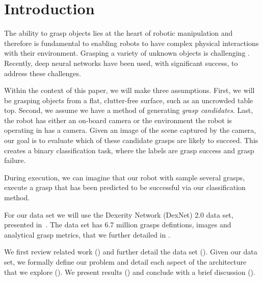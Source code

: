 
\section{Introduction}
\label{sec:intro}

The ability to grasp objects lies at the heart of robotic manipulation and therefore is fundamental to enabling robots to have complex physical interactions with their environment. 
Grasping a variety of unknown objects is challenging . 
Recently, deep neural networks have been used, with significant success, to address these challenges. 

Within the context of this paper, we will make three assumptions. 
First, we will be grasping objects from a flat, clutter-free surface, such as an uncrowded table top. 
Second, we assume we have a method of generating \textit{grasp candidates}. 
Last, the robot has either an on-board camera or the environment the robot is operating in has a camera. 
Given an image of the scene captured by the camera, our goal is to evaluate which of these candidate grasps are likely to succeed. 
This creates a binary classification task, where the labels are grasp success and grasp failure. 

During execution, we can imagine that our robot with sample several grasps, execute a grasp that has been predicted to be successful via our classification method.  

For our data set we will use the Dexerity Network (DexNet) 2.0 data set, presented in~\cite{mahler2017dex}. 
The data set has 6.7 million grasps defintions, images and analytical grasp metrics, that we further detailed in . 


We first review related work () and further detail the data set (). 
Given our data set, we formally define our problem and detail each aspect of the architecture that we explore (). 
We present results () and conclude with a brief discussion (). 

\begin{comment}
The authors of the data set trained a Grasp Quality Convolutional Neural Network (GQ-CNN), which achieved 85.7\% accuracy on their classification task.
To accomplish the same task, we will be experimenting with new architectures, intput formats, other modifications described in~\sref{sec:questions}.
Most of the recent machine learning papers in robotics present a problem, dataset and, usually, an optimized convolutional neural network with some architecture and input format. 
Our goal is to explore the process of finding that CNN and exploring the factors that effect performance. 
While our results will only be verified according to this data set, and therefore cannot be generalized to all CNNs, we hope to gain intution, understanding, and, hopefully, a higher accuracy. 
Having explored various components, we will optimize our final, best architecture. 
\end{comment}
